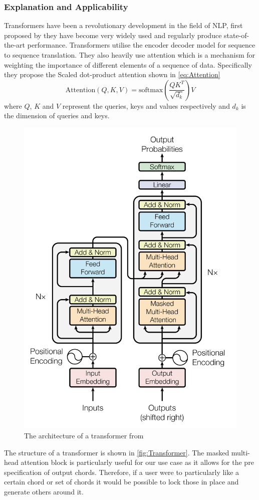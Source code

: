 \subsubsection{Explanation and Applicability}

Transformers have been a revolutionary development in the field of NLP, first proposed by \cite{Transformers} they have become very widely used and regularly produce state-of-the-art performance.
Transformers utilise the encoder decoder model for sequence to sequence translation.
They also heavily use attention which is a mechanism for weighting the importance of different elements of a sequence of data.
Specifically they propose the Scaled dot-product attention shown in \autoref{eq:Attention}
\begin{equation}
    \text{Attention}(Q,K,V) = \text{softmax}(\frac{QK^T}{\sqrt{d_k}})V
    \label{eq:Attention}
\end{equation}
where $Q$, $K$ and $V$ represent the queries, keys and values respectively and $d_k$ is the dimension of queries and keys.

\begin{figure}
    \centering
    \includegraphics[width=0.6\columnwidth]{Figures/Transformer}
    \decoRule
    \caption{The architecture of a transformer from \cite{Transformers}}
    \label{fig:Transformer}
\end{figure}

The structure of a transformer is shown in \autoref{fig:Transformer}.
The masked multi-head attention block is particularly useful for our use case as it allows for the pre specification of output chords.
Therefore, if a user were to particularly like a certain chord or set of chords it would be possible to lock those in place and generate others around it.

